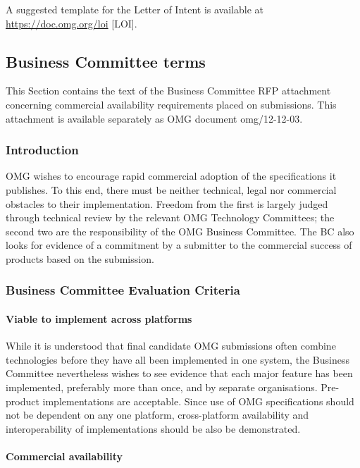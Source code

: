 A suggested template for the Letter of Intent is available at \url{https://doc.omg.org/loi} [LOI].


\subsection{Business Committee terms}

This Section contains the text of the Business Committee RFP attachment concerning commercial availability requirements placed on submissions. This attachment is available separately as OMG document omg/12-12-03.


\subsubsection{Introduction}

OMG wishes to encourage rapid commercial adoption of the specifications it publishes. To this end, there must be neither technical, legal nor commercial obstacles to their implementation. Freedom from the first is largely judged through technical review by the relevant OMG Technology Committees; the second two are the responsibility of the OMG Business Committee. The BC also looks for evidence of a commitment by a submitter to the commercial success of products based on the submission.


\subsubsection{Business Committee Evaluation Criteria}
\paragraph{Viable to implement across platforms}

While it is understood that final candidate OMG submissions often combine technologies before they have all been implemented in one system, the Business Committee nevertheless wishes to see evidence that each major feature has been implemented, preferably more than once, and by separate organisations. Pre-product implementations are acceptable. Since use of OMG specifications should not be dependent on any one platform, cross-platform availability and interoperability of implementations should be also be demonstrated.


\paragraph{Commercial availability}


